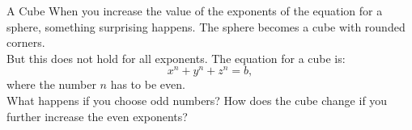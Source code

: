 \begin{surferPage}[Cube]{A Cube}
When you increase the value of the exponents of the equation for a sphere, something surprising happens. The sphere becomes a cube with rounded corners.\\
\vspace{0.3cm}
But this does not hold for all exponents. The equation for a cube is:
\[x^n+y^n+z^n=b,\]
where the number $n$ has to be even.\\
\vspace{0.3cm}
What happens if you choose odd numbers? How does the cube change if you further increase the even exponents?
\end{surferPage}
